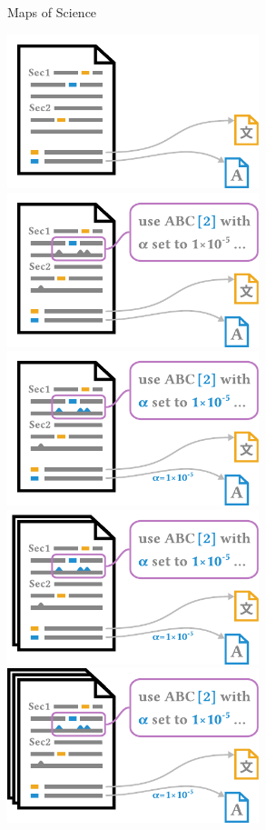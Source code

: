 \documentclass[en,16:9,smallfoot]{sdqbeamer}
\begin{document}
\begin{frame}{Maps of Science}
\begin{overprint}
            \centering\includegraphics[width=0.55\textwidth]{imgs/schema_add_05}
            \centering\includegraphics[width=0.55\textwidth]{imgs/schema_add_06}
            \centering\includegraphics[width=0.55\textwidth]{imgs/schema_add_07}
            \centering\includegraphics[width=0.55\textwidth]{imgs/schema_add_08}
            \centering\includegraphics[width=0.55\textwidth]{imgs/schema_add_09}
       \end{overprint}
   \end{frame}
\end{document}
